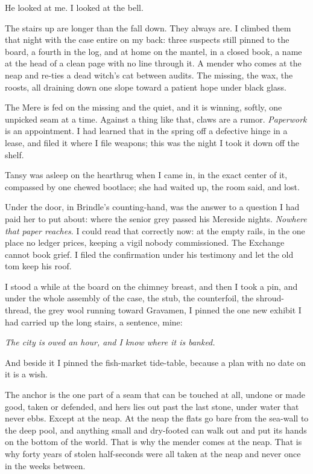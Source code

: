 He looked at me. I looked at the bell.

The stairs up are longer than the fall down. They always are. I climbed them that night with the case entire on my back: three suspects still pinned to the board, a fourth in the log, and at home on the mantel, in a closed book, a name at the head of a clean page with no line through it. A mender who comes at the neap and re-ties a dead witch's cat between audits. The missing, the wax, the roosts, all draining down one slope toward a patient hope under black glass.

The Mere is fed on the missing and the quiet, and it is winning, softly, one unpicked seam at a time. Against a thing like that, claws are a rumor. \emph{Paperwork} is an appointment. I had learned that in the spring off a defective hinge in a lease, and filed it where I file weapons; this was the night I took it down off the shelf.

Tansy was asleep on the hearthrug when I came in, in the exact center of it, compassed by one chewed bootlace; she had waited up, the room said, and lost.

Under the door, in Brindle's counting-hand, was the answer to a question I had paid her to put about: where the senior grey passed his Mereside nights. \emph{Nowhere that paper reaches}. I could read that correctly now: at the empty rails, in the one place no ledger prices, keeping a vigil nobody commissioned. The Exchange cannot book grief. I filed the confirmation under his testimony and let the old tom keep his roof.

I stood a while at the board on the chimney breast, and then I took a pin, and under the whole assembly of the case, the stub, the counterfoil, the shroud-thread, the grey wool running toward Gravamen, I pinned the one new exhibit I had carried up the long stairs, a sentence, mine:

\emph{The city is owed an hour, and I know where it is banked.}

And beside it I pinned the fish-market tide-table, because a plan with no date on it is a wish.

The anchor is the one part of a seam that can be touched at all, undone or made good, taken or defended, and hers lies out past the last stone, under water that never ebbs. Except at the neap. At the neap the flats go bare from the sea-wall to the deep pool, and anything small and dry-footed can walk out and put its hands on the bottom of the world. That is why the mender comes at the neap. That is why forty years of stolen half-seconds were all taken at the neap and never once in the weeks between.

